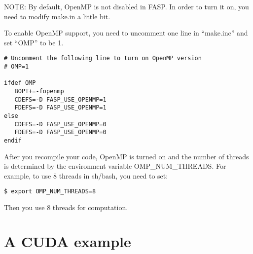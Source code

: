 \documentclass[11pt]{memoir}
\begin{document}
\begin{snugshade}\noindent
NOTE: By default, OpenMP is not disabled in FASP. In order to turn it on, you need to modify make.in a little bit.
\end{snugshade}

To enable OpenMP support, you need to uncomment one line in ``make.inc'' and set ``OMP'' to be 1.
\begin{lstlisting}[numbers=none]
# Uncomment the following line to turn on OpenMP version                                                                                                      
# OMP=1
                                                                                                                                                      
ifdef OMP                                                                                                                                                     
   BOPT+=-fopenmp                                                                                                                                             
   CDEFS=-D FASP_USE_OPENMP=1                                                                                                                                 
   FDEFS=-D FASP_USE_OPENMP=1                                                                                                                                 
else                                                                                                                                                          
   CDEFS=-D FASP_USE_OPENMP=0                                                                                                                                 
   FDEFS=-D FASP_USE_OPENMP=0                                                                                                                                 
endif                                               
\end{lstlisting}

After you recompile your code, OpenMP is turned on and the number of threads is determined by the environment variable OMP\_NUM\_THREADS. For example, to use 8 threads in {\color{red} sh/bash}, you need to set:
\begin{lstlisting}[numbers=none]
$ export OMP_NUM_THREADS=8
\end{lstlisting}
Then you use 8 threads for computation. 

\section{A CUDA example}\label{sec:cuda}
\end{document}

